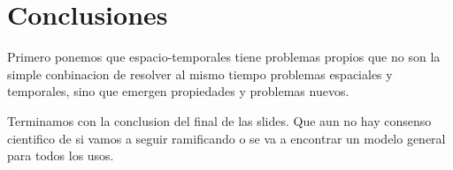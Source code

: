\usepackage[utf8]{inputenc}
\chapter{Conclusiones}  \label{cap:conc}

Primero ponemos que espacio-temporales tiene problemas propios que no son la simple conbinacion de resolver al mismo tiempo problemas espaciales y temporales, sino que emergen propiedades y problemas nuevos.

Terminamos con la conclusion del final de las slides. Que aun no hay consenso cientifico de si vamos a seguir ramificando o se va a encontrar un modelo general para todos los usos.
